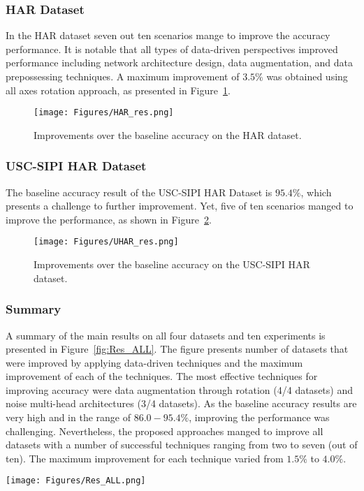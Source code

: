 \documentclass[journal]{IEEEtran}
\begin{document}
\subsubsection{HAR Dataset}
In the HAR dataset seven out ten scenarios mange to improve the accuracy performance. It is notable that all types of data-driven perspectives improved performance including network architecture design, data augmentation, and data prepossessing techniques.  A maximum improvement of $3.5\%$ was obtained using all axes rotation approach, as presented in Figure~\ref{fig:HAR_res}.
%
\begin{figure}[h]
    \centering
    \texttt{[image: Figures/HAR\_res.png]}
    \caption{Improvements over the baseline accuracy on the HAR dataset.}
    \label{fig:HAR_res}
\end{figure}
%
\subsubsection{USC-SIPI HAR Dataset} 
The baseline accuracy result of the USC-SIPI HAR Dataset is $95.4\%$, which presents a challenge to further improvement. Yet, five of ten scenarios manged to improve the performance, as shown in Figure~\ref{fig:UHAR_res}.
%
\begin{figure}[h]
    \centering
    \texttt{[image: Figures/UHAR\_res.png]}
    \caption{Improvements over the baseline accuracy on the USC-SIPI HAR dataset.}
    \label{fig:UHAR_res}
\end{figure}
%
\subsubsection{Summary} 
A summary of the main results on all four datasets and ten experiments is presented in Figure~\ref{fig:Res_ALL}.  The figure presents number of datasets that were improved by applying data-driven techniques and the maximum improvement of each of the techniques. The most effective techniques for improving accuracy were data augmentation through rotation (4/4 datasets) and noise multi-head architectures (3/4 datasets). As the baseline accuracy results are very high and in the range of $86.0-95.4\%$, improving the performance was challenging. Nevertheless, the proposed approaches manged to improve all datasets with a number of successful techniques ranging from two to seven (out of ten). The maximum improvement for each technique varied from $1.5\%$ to $4.0\%$.
%
\begin{figure*}[h]
    \centering
    \texttt{[image: Figures/Res\_ALL.png]}
    \caption{Summary of the results showing the number of datasets that were improved by applying data-driven techniques (blue bars) and the maximum improvement of each of the techniques (orange circles).}
    \label{fig:Res_ALL}
\end{figure*}
%
\end{document}
